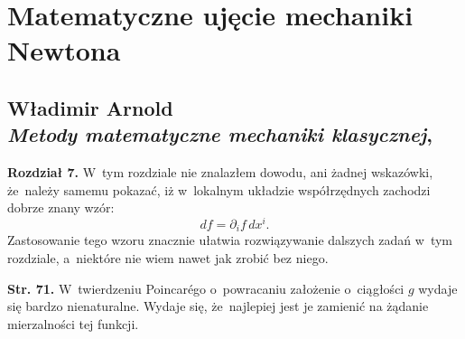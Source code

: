 \documentclass[a4paper,11pt]{article}
\numberwithin{equation}{section}
\begin{document}










\newpage

\section{Matematyczne ujęcie mechaniki Newtona}



\subsection{ %
  Władimir Arnold \\
  \textit{Metody matematyczne mechaniki klasycznej},
  \cite{ArnoldMetodyMatematyczneMechanikiKlasycznej1981}}

\vspace{0em}



\vspace{0em}


\noindent
\textbf{Rozdział 7.} W~tym rozdziale nie znalazłem dowodu, ani
żadnej wskazówki, że~należy samemu pokazać, iż w~lokalnym układzie
współrzędnych zachodzi dobrze znany wzór:
\begin{equation*}
  \label{eq:Arnold-MetodyMatematyczneETC-01}
  d f = \partial_{ i } f\, d x^{ i }.
\end{equation*}
Zastosowanie tego wzoru znacznie ułatwia rozwiązywanie dalszych zadań
w~tym rozdziale, a~niektóre nie wiem nawet jak zrobić bez niego.

\VerSpaceFour





\noindent
\textbf{Str. 71.} W~twierdzeniu Poincar\'{e}go o~powracaniu
założenie o~ciągłości $g$ wydaje się bardzo nienaturalne. Wydaje się,
że~najlepiej jest je zamienić na żądanie mierzalności tej funkcji.

\VerSpaceFour







\newpage

\end{document}
